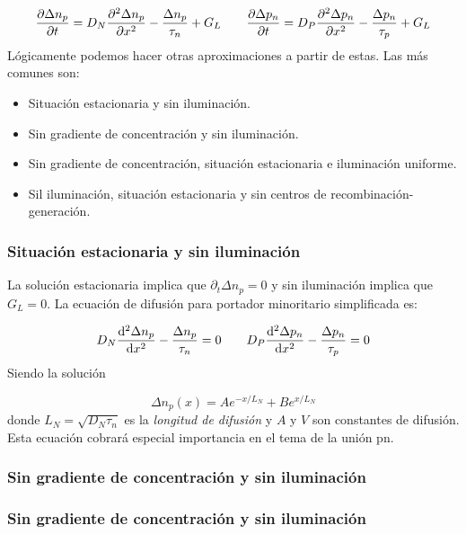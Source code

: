 \begin{equation}
	\frac{\partial \Delta n_p}{\partial t} = D_N \frac{\partial ^2 \Delta n_p}{\partial x^2} - \frac{\Delta n_p}{\tau_n} + G_L \qquad 
	\frac{\partial \Delta p_n}{\partial t} = D_P \frac{\partial ^2 \Delta p_n}{\partial x^2} - \frac{\Delta p_n}{\tau_p} + G_L
\end{equation}
Lógicamente podemos hacer otras aproximaciones a partir de estas. Las más comunes son:

\begin{itemize}
	\item Situación estacionaria y sin iluminación.
	\item Sin gradiente de concentración y sin iluminación.
	\item Sin gradiente de concentración, situación estacionaria e iluminación uniforme.
	\item Sil iluminación, situación estacionaria y sin centros de recombinación-generación.
\end{itemize}

\subsubsection{Situación estacionaria y sin iluminación} \label{Subsec:02-04-02}

La solución estacionaria implica que $\partial_t \Delta n_p=0$ y sin iluminación implica que $G_L=0$. La ecuación de difusión para portador minoritario simplificada es:

\begin{equation}
	D_N \frac{\mathrm{d} ^2 \Delta n_p}{\mathrm{d}  x^2} - \frac{\Delta n_p}{\tau_n} = 0 \qquad
	D_P \frac{\mathrm{d} ^2 \Delta p_n}{\mathrm{d}  x^2} - \frac{\Delta p_n}{\tau_p} = 0
\end{equation}
Siendo la solución

\begin{equation}
	\Delta n_p (x) = A e^{-x/L_N} + B e^{x/L_N}
\end{equation}
donde $L_N=\sqrt{D_N \tau_n}$ es la \textit{longitud de difusión} y $A$ y $V$ son constantes de difusión. Esta ecuación cobrará especial importancia en el tema de la unión pn.

\subsubsection{Sin gradiente de concentración y sin iluminación}
\subsubsection{Sin gradiente de concentración y sin iluminación}
